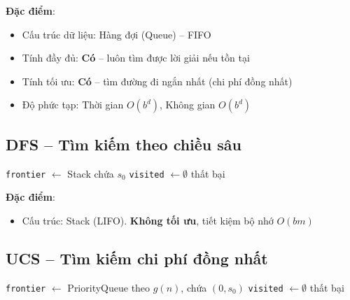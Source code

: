 \documentclass[a4paper,12pt]{article}
\begin{document}
\textbf{Đặc điểm}:
\begin{itemize}
    \item Cấu trúc dữ liệu: Hàng đợi (Queue) -- FIFO
    \item Tính đầy đủ: \textbf{Có} -- luôn tìm được lời giải nếu tồn tại
    \item Tính tối ưu: \textbf{Có} -- tìm đường đi ngắn nhất (chi phí đồng nhất)
    \item Độ phức tạp: Thời gian $O(b^d)$, Không gian $O(b^d)$
\end{itemize}

\subsection{DFS -- Tìm kiếm theo chiều sâu}

\begin{algorithm}[H]
\caption{DFS -- Depth-First Search}
\label{alg:dfs}
\texttt{frontier} $\leftarrow$ Stack chứa $s_0$\;
\texttt{visited} $\leftarrow \emptyset$\;
\Return thất bại\;
\end{algorithm}

\textbf{Đặc điểm}:
\begin{itemize}
    \item Cấu trúc: Stack (LIFO). \textbf{Không tối ưu}, tiết kiệm bộ nhớ $O(bm)$
\end{itemize}

\subsection{UCS -- Tìm kiếm chi phí đồng nhất}

\begin{algorithm}[H]
\caption{UCS -- Uniform Cost Search}
\label{alg:ucs}
\texttt{frontier} $\leftarrow$ PriorityQueue theo $g(n)$, chứa $(0, s_0)$\;
\texttt{visited} $\leftarrow \emptyset$\;
\Return thất bại\;
\end{algorithm}
\end{document}
